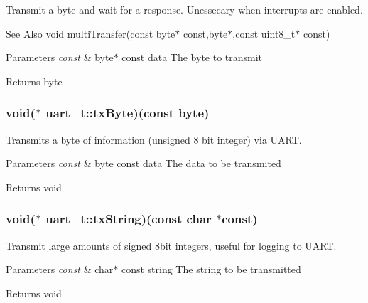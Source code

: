 Transmit a byte and wait for a response. Unessecary when interrupts are enabled. 

\begin{DoxySeeAlso}{See Also}
void multi\-Transfer(const byte$\ast$ const,byte$\ast$,const uint8\-\_\-t$\ast$ const) 
\end{DoxySeeAlso}

\begin{DoxyParams}{Parameters}
{\em const} & byte$\ast$ const data The byte to transmit \\
\hline
\end{DoxyParams}
\begin{DoxyReturn}{Returns}
byte 
\end{DoxyReturn}
\hypertarget{a00018_ga2ee9c992930c7a52010c7a6abf0d316c}{
\subsubsection[{tx\-Byte}]{\setlength{\rightskip}{0pt plus 5cm}void($\ast$ uart\-\_\-t\-::tx\-Byte)(const {\bf byte})}}\label{a00018_ga2ee9c992930c7a52010c7a6abf0d316c}


Transmits a byte of information (unsigned 8 bit integer) via U\-A\-R\-T. 


\begin{DoxyParams}{Parameters}
{\em const} & byte const data The data to be transmited \\
\hline
\end{DoxyParams}
\begin{DoxyReturn}{Returns}
void 
\end{DoxyReturn}
\hypertarget{a00018_gaced0693da5d9c07328e6a325d6d7edee}{
\subsubsection[{tx\-String}]{\setlength{\rightskip}{0pt plus 5cm}void($\ast$ uart\-\_\-t\-::tx\-String)(const char $\ast$const)}}\label{a00018_gaced0693da5d9c07328e6a325d6d7edee}


Transmit large amounts of signed 8bit integers, useful for logging to U\-A\-R\-T. 


\begin{DoxyParams}{Parameters}
{\em const} & char$\ast$ const string The string to be transmitted \\
\hline
\end{DoxyParams}
\begin{DoxyReturn}{Returns}
void 
\end{DoxyReturn}
